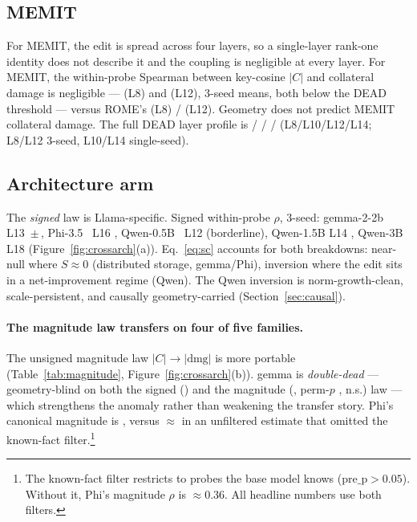\subsection{MEMIT}
For MEMIT, the edit is spread across four layers, so a single-layer
rank-one identity does not describe it and the coupling is negligible at
every layer.
For MEMIT, the within-probe Spearman between key-cosine $|C|$ and collateral
damage is negligible --- \memitRhoLeight{} (L8) and \memitRhoLtwelve{} (L12),
3-seed means, both below the \deadThresh{} DEAD threshold --- versus ROME's
\romeCmpLeight{} (L8) / \romeCmpLtwelve{} (L12). Geometry does not predict
MEMIT collateral damage. The full DEAD layer profile is \rhoC{}
\memitRhoLeight{} / \memitRhoLten{} / \memitRhoLtwelve{} / \memitRhoLfourteen{}
(L8/L10/L12/L14; L8/L12 3-seed, L10/L14 single-seed).

\subsection{Architecture arm}
The \emph{signed} law is Llama-specific. Signed within-probe $\rho$, 3-seed:
gemma-2-2b~\citep{gemmateam2024gemma2} L13
\gemmaSigned{}\,$\pm$\,\gemmaSignedSD{}, Phi-3.5~\citep{abdin2024phi3} L16
\phiSigned{}, Qwen-0.5B~\citep{qwen2024qwen25} L12 \qwenHalfSigned{}
(borderline), Qwen-1.5B L14
\qwenFifteenSigned{}, Qwen-3B L18 \qwenThreeSigned{} (Figure~\ref{fig:crossarch}(a)).
Eq.~\ref{eq:sc} accounts for both breakdowns: near-null where $S\approx 0$
(distributed storage, gemma/Phi), inversion where the edit sits in a
net-improvement regime (Qwen). The Qwen inversion is norm-growth-clean,
scale-persistent, and causally geometry-carried (Section~\ref{sec:causal}).

\paragraph{The magnitude law transfers on four of five families.} The
unsigned magnitude law $|C|\rightarrow|\text{dmg}|$ is more portable
(Table~\ref{tab:magnitude}, Figure~\ref{fig:crossarch}(b)).
gemma is \emph{double-dead} --- geometry-blind on both the signed
(\gemmaSigned{}) and the magnitude (\magGemma{}, perm-$p$ \magGemmaPermP{},
n.s.) law --- which strengthens the anomaly rather than weakening the
transfer story. Phi's canonical magnitude is \magPhi{}, versus
$\approx$\magPhiPeek{} in an unfiltered estimate that omitted the
known-fact filter.\footnote{The known-fact filter restricts to probes the
base model knows ($\text{pre\_p}>0.05$). Without it, Phi's magnitude $\rho$
is $\approx$0.36. All headline numbers use both filters.}

